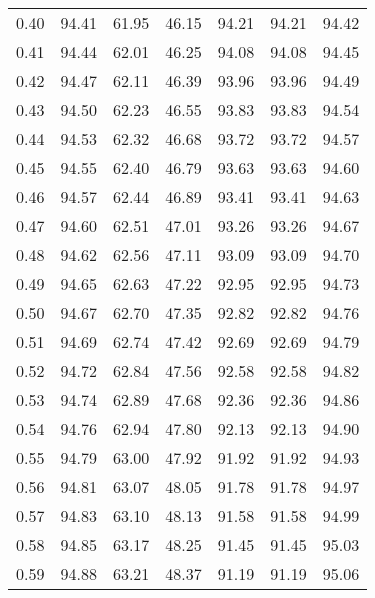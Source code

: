\begin{tabular}{|c|c|c|c|c|c|c|}
      0.40 &     94.41 &     61.95 &      46.15 &   94.21 &      94.21 &         94.42 \\
      0.41 &     94.44 &     62.01 &      46.25 &   94.08 &      94.08 &         94.45 \\
      0.42 &     94.47 &     62.11 &      46.39 &   93.96 &      93.96 &         94.49 \\
      0.43 &     94.50 &     62.23 &      46.55 &   93.83 &      93.83 &         94.54 \\
      0.44 &     94.53 &     62.32 &      46.68 &   93.72 &      93.72 &         94.57 \\
      0.45 &     94.55 &     62.40 &      46.79 &   93.63 &      93.63 &         94.60 \\
      0.46 &     94.57 &     62.44 &      46.89 &   93.41 &      93.41 &         94.63 \\
      0.47 &     94.60 &     62.51 &      47.01 &   93.26 &      93.26 &         94.67 \\
      0.48 &     94.62 &     62.56 &      47.11 &   93.09 &      93.09 &         94.70 \\
      0.49 &     94.65 &     62.63 &      47.22 &   92.95 &      92.95 &         94.73 \\
      0.50 &     94.67 &     62.70 &      47.35 &   92.82 &      92.82 &         94.76 \\
      0.51 &     94.69 &     62.74 &      47.42 &   92.69 &      92.69 &         94.79 \\
      0.52 &     94.72 &     62.84 &      47.56 &   92.58 &      92.58 &         94.82 \\
      0.53 &     94.74 &     62.89 &      47.68 &   92.36 &      92.36 &         94.86 \\
      0.54 &     94.76 &     62.94 &      47.80 &   92.13 &      92.13 &         94.90 \\
      0.55 &     94.79 &     63.00 &      47.92 &   91.92 &      91.92 &         94.93 \\
      0.56 &     94.81 &     63.07 &      48.05 &   91.78 &      91.78 &         94.97 \\
      0.57 &     94.83 &     63.10 &      48.13 &   91.58 &      91.58 &         94.99 \\
      0.58 &     94.85 &     63.17 &      48.25 &   91.45 &      91.45 &         95.03 \\
      0.59 &     94.88 &     63.21 &      48.37 &   91.19 &      91.19 &         95.06 \\

\end{tabular}
